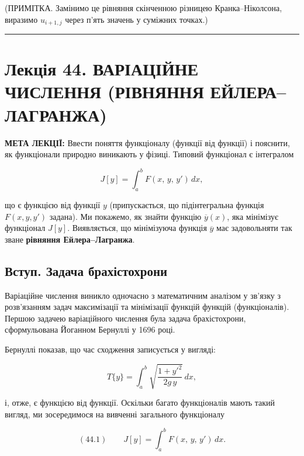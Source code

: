 \documentclass[
  ukrainian,
]{article}
\begin{document}
(ПРИМІТКА. Замінимо це рівняння скінченною різницею Кранка--Ніколсона,
виразимо \(u_{i+1,j}\) через п'ять значень у суміжних точках.)

\begin{center}\rule{0.5\linewidth}{0.5pt}\end{center}

\section{Лекція 44. ВАРІАЦІЙНЕ ЧИСЛЕННЯ (РІВНЯННЯ
ЕЙЛЕРА--ЛАГРАНЖА)}\label{ux43bux435ux43aux446ux456ux44f-44.-ux432ux430ux440ux456ux430ux446ux456ux439ux43dux435-ux447ux438ux441ux43bux435ux43dux43dux44f-ux440ux456ux432ux43dux44fux43dux43dux44f-ux435ux439ux43bux435ux440ux430ux43bux430ux433ux440ux430ux43dux436ux430}

\textbf{МЕТА ЛЕКЦІЇ:} Ввести поняття функціоналу (функції від функції) і
пояснити, як функціонали природно виникають у фізиці. Типовий функціонал
є інтегралом

\[J[y] = \int_a^b F(x,\, y,\, y')\, dx,\]

що є функцією від функції \(y\) (припускається, що підінтегральна
функція \(F(x, y, y')\) задана). Ми покажемо, як знайти функцію
\(\overline{y}(x)\), яка мінімізує функціонал \(J[y]\). Виявляється, що
мінімізуюча функція \(\overline{y}\) має задовольняти так зване
\textbf{рівняння Ейлера--Лагранжа}.

\subsection{Вступ. Задача
брахістохрони}\label{ux432ux441ux442ux443ux43f.-ux437ux430ux434ux430ux447ux430-ux431ux440ux430ux445ux456ux441ux442ux43eux445ux440ux43eux43dux438}

Варіаційне числення виникло одночасно з математичним аналізом у зв'язку
з розв'язанням задач максимізації та мінімізації функцій функцій
(функціоналів). Першою задачею варіаційного числення була задача
брахістохрони, сформульована Йоганном Бернуллі у 1696 році.

Бернуллі показав, що час сходження записується у вигляді:

\[T\{y\} = \int_a^b \sqrt{\frac{1+y'^2}{2g\,y}}\, dx,\]

і, отже, є функцією від функції. Оскільки багато функціоналів мають
такий вигляд, ми зосередимося на вивченні загального функціоналу

\[(44.1)\qquad J[y] = \int_a^b F(x,\, y,\, y')\, dx.\]
\end{document}
